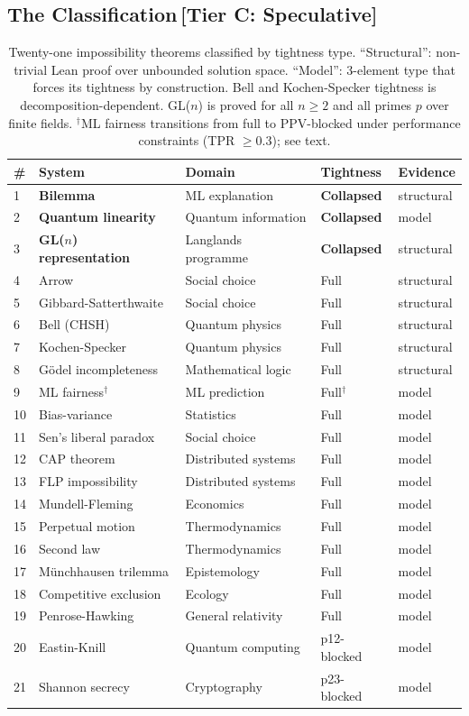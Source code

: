 \documentclass[11pt,a4paper]{article}
\begin{document}
\subsection{The Classification\,\textnormal{\normalsize[Tier C: Speculative]}}

\begin{table}[h]
\centering
\small
\caption{Twenty-one impossibility theorems classified by tightness type.  ``Structural'': non-trivial Lean proof over unbounded solution space.  ``Model'': 3-element type that forces its tightness by construction.  Bell and Kochen-Specker tightness is decomposition-dependent.  GL($n$) is proved for all $n \geq 2$ and all primes $p$ over finite fields.  $^\dagger$ML fairness transitions from full to PPV-blocked under performance constraints (TPR $\geq 0.3$); see text.}
\label{tab:classification}
\begin{tabular}{@{}lllll@{}}
\toprule
\# & System & Domain & Tightness & Evidence \\
\midrule
1 & \textbf{Bilemma} & ML explanation & \textbf{Collapsed} & structural \\
2 & \textbf{Quantum linearity} & Quantum information & \textbf{Collapsed} & model \\
3 & \textbf{GL($n$) representation} & Langlands programme & \textbf{Collapsed} & structural \\
\midrule
4 & Arrow & Social choice & Full & structural \\
5 & Gibbard-Satterthwaite & Social choice & Full & structural \\
6 & Bell (CHSH) & Quantum physics & Full & structural \\
7 & Kochen-Specker & Quantum physics & Full & structural \\
8 & G\"odel incompleteness & Mathematical logic & Full & structural \\
9 & ML fairness$^\dagger$ & ML prediction & Full$^\dagger$ & model \\
10 & Bias-variance & Statistics & Full & model \\
11 & Sen's liberal paradox & Social choice & Full & model \\
12 & CAP theorem & Distributed systems & Full & model \\
13 & FLP impossibility & Distributed systems & Full & model \\
14 & Mundell-Fleming & Economics & Full & model \\
15 & Perpetual motion & Thermodynamics & Full & model \\
16 & Second law & Thermodynamics & Full & model \\
17 & M\"unchhausen trilemma & Epistemology & Full & model \\
18 & Competitive exclusion & Ecology & Full & model \\
19 & Penrose-Hawking & General relativity & Full & model \\
\midrule
20 & Eastin-Knill & Quantum computing & p12-blocked & model \\
21 & Shannon secrecy & Cryptography & p23-blocked & model \\
\bottomrule
\end{tabular}
\end{table}
\end{document}
